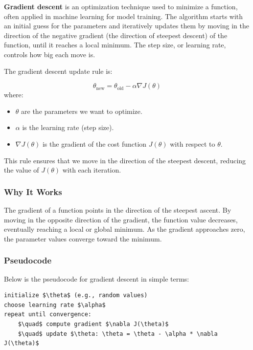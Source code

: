 \documentclass[letterpaper,12pt,notitlepage,twoside]{report}
\begin{document}
\newpage
\textbf{Gradient descent} is an optimization technique used to minimize a function, often applied in machine learning for model training. The algorithm starts with an initial guess for the parameters and iteratively updates them by moving in the direction of the negative gradient (the direction of steepest descent) of the function, until it reaches a local minimum. The step size, or learning rate, controls how big each move is.

The gradient descent update rule is:

\[
\theta_{\text{new}} = \theta_{\text{old}} - \alpha \nabla J(\theta)
\]
where:
\begin{itemize}
    \item \( \theta \) are the parameters we want to optimize.
    \item \( \alpha \) is the learning rate (step size).
    \item \( \nabla J(\theta) \) is the gradient of the cost function \( J(\theta) \) with respect to \( \theta \).
\end{itemize}
This rule ensures that we move in the direction of the steepest descent, reducing the value of \( J(\theta) \) with each iteration.

\subsubsection{Why It Works}
The gradient of a function points in the direction of the steepest ascent. By moving in the opposite direction of the gradient, the function value decreases, eventually reaching a local or global minimum. As the gradient approaches zero, the parameter values converge toward the minimum.

\subsubsection{Pseudocode}
Below is the pseudocode for gradient descent in simple terms:

\begin{lstlisting}
initialize $\theta$ (e.g., random values) 
choose learning rate $\alpha$
repeat until convergence:
    $\quad$ compute gradient $\nabla J(\theta)$
    $\quad$ update $\theta: \theta = \theta - \alpha * \nabla J(\theta)$
\end{lstlisting}
\end{document}
